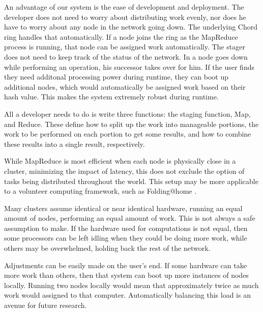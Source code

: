 \documentclass[conference, compsocconf, letterpaper]{IEEEtran}
\begin{document}
An advantage of our system is the ease of development and deployment.  The developer does not need to worry about distributing work evenly, nor does he have to worry about any node in the network going down.  The underlying Chord ring handles that automatically.  If a node joins the ring as the MapReduce process is running, that node can be assigned work automatically.  The stager does not need to keep track of the status of the network.  In a node goes down while performing an operation, his successor takes over for him.  If the user finds they need additonal processing power during runtime, they can boot up additional nodes, which would automatically be assigned work based on their hash value.  This makes the system extremely robust during runtime.

All a developer needs to do is write three functions: the staging function, Map, and Reduce.  These define how to split up the work into manageable portions, the work to be performed on each portion to get some results, and how to combine these results into a single result, respectively. 

While MapReduce is most efficient when each node is physically close in a cluster, minimizing the impact of latency, this does not exclude the option of tasks being distributed throughout the world.  This setup may be more applicable to a volunteer computing framework, such as Folding@home \cite{folding}.

Many clusters assume identical or near identical hardware, running an equal amount of nodes, performing an equal amount of work. This is not always a safe assumption to make.  If the hardware used for computations is not equal, then some processors can be left idling when they could be doing more work, while others may be overwhelmed, holding back the rest of the network.

Adjustments can be easily made on the user's end.  If some hardware can take more work than others, then that system can boot up more instances of nodes locally. Running two nodes locally would mean that approximately twice as much work would assigned to that computer.  Automatically balancing this load is an avenue for future research.


\end{document}
